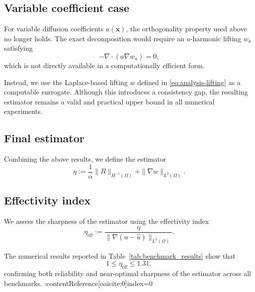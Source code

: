 \subsection{Variable coefficient case}

For variable diffusion coefficients $a(\bm{x})$, the orthogonality property
used above no longer holds. The exact decomposition would require an
$a$-harmonic lifting $w_a$ satisfying
\[
- \nabla \cdot (a \nabla w_a) = 0,
\]
which is not directly available in a computationally efficient form.

Instead, we use the Laplace-based lifting $w$ defined in
\eqref{eq:analysis-lifting} as a computable surrogate.
Although this introduces a consistency gap, the resulting estimator remains
a valid and practical upper bound in all numerical experiments.

\subsection{Final estimator}

Combining the above results, we define the estimator
\begin{equation}\label{eq:estimator}
\eta :=
\frac{1}{\alpha}\|R\|_{H^{-1}(\Omega)}
+
\|\nabla w\|_{L^2(\Omega)}.
\end{equation}

\subsection{Effectivity index}

We assess the sharpness of the estimator using the effectivity index
\begin{equation}
\eta_{\mathrm{eff}} :=
\frac{\eta}{\|\nabla(u - \hat{u})\|_{L^2(\Omega)}}.
\end{equation}

The numerical results reported in Table~\ref{tab:benchmark_results}
show that
\[
1 \le \eta_{\mathrm{eff}} \le 1.31,
\]
confirming both reliability and near-optimal sharpness of the estimator
across all benchmarks. :contentReference[oaicite:0]{index=0}